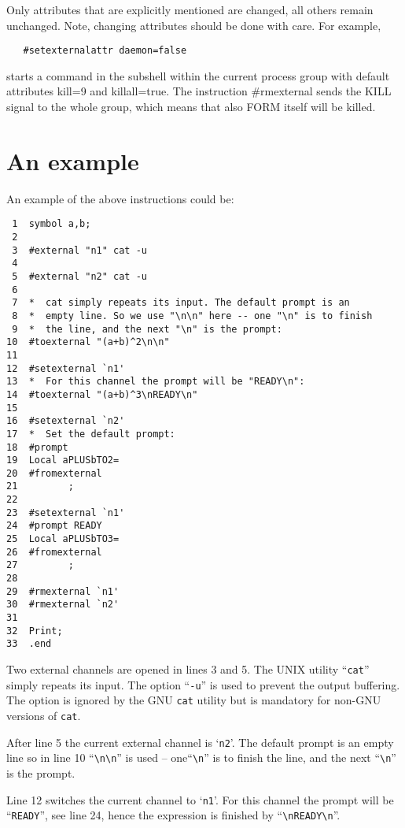 Only attributes that are explicitly mentioned are changed, all others remain 
unchanged. Note, changing attributes should be done with care. For example,
\begin{verbatim}
   #setexternalattr daemon=false
\end{verbatim}
starts a command in the subshell within the current process group with
default attributes kill=9 and killall=true.
The instruction \#rmexternal sends the
KILL signal to the whole group, which means that also 
FORM itself will be killed.


\section{An example}
 
An example of the above instructions could be:
\begin{verbatim}
 1  symbol a,b;
 2
 3  #external "n1" cat -u
 4
 5  #external "n2" cat -u
 6
 7  *  cat simply repeats its input. The default prompt is an
 8  *  empty line. So we use "\n\n" here -- one "\n" is to finish
 9  *  the line, and the next "\n" is the prompt:
10  #toexternal "(a+b)^2\n\n"
11
12  #setexternal `n1'
13  *  For this channel the prompt will be "READY\n":
14  #toexternal "(a+b)^3\nREADY\n"
15
16  #setexternal `n2'
17  *  Set the default prompt:
18  #prompt
19  Local aPLUSbTO2=
20  #fromexternal
21         ;
22
23  #setexternal `n1'
24  #prompt READY
25  Local aPLUSbTO3=
26  #fromexternal
27         ;
28
29  #rmexternal `n1'
30  #rmexternal `n2'
31
32  Print;
33  .end
\end{verbatim}

Two external channels are opened in lines 3 and 5. The UNIX 
utility ``\verb|cat|'' simply repeats its input.
The option ``\verb|-u|'' is used to prevent the output buffering. The 
option is ignored by the GNU \verb|cat| utility but is mandatory 
for non-GNU versions of \verb|cat|.

After line 5 the current external channel is `\verb|n2|'. The default 
prompt is an empty line so in line 10 ``\verb|\n\n|'' is used -- 
one``\verb|\n|'' is to finish the line, and the next ``\verb|\n|'' is the 
prompt.

Line 12 switches the current channel to `\verb|n1|'. For this channel
the prompt will be ``\verb|READY|'', see line 24, hence the expression is
finished by ``\verb|\nREADY\n|''.

